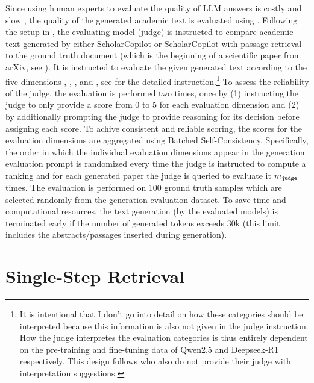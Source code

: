 Since using human experts to evaluate the quality of LLM answers is costly and slow \cite{heineking2025ranking}, the quality of the generated academic text is evaluated using  \cite{guo2025deepseek}. Following the setup in \cite{wang2025scholarcopilot}, the evaluating model (judge) is instructed to compare academic text generated by either ScholarCopilot or ScholarCopilot with passage retrieval to the ground truth document (which is the beginning of a scientific paper from arXiv, see ). It is instructed to evaluate the given generated text according to the five dimensions , , ,  and , see  for the detailed instruction.\footnote{It is intentional that I don't go into detail on how these categories should be interpreted because this information is also not given in the judge instruction. How the judge interpretes the evaluation categories is thus entirely dependent on the pre-training and fine-tuning data of Qwen2.5 and Deepseek-R1 respectively. This design follows \cite{wang2025scholarcopilot} who also do not provide their judge with interpretation suggestions.} To assess the reliability of the judge, the evaluation is performed two times, once by (1) instructing the judge to only provide a score from 0 to 5 for each evaluation dimension and (2) by additionally prompting the judge to provide reasoning for its decision before assigning each score. To achive consistent and reliable scoring, the scores for the evaluation dimensions are aggregated using Batched Self-Consistency. Specifically, the order in which the individual evaluation dimensions appear in the generation evaluation prompt is randomized every time the judge is instructed to compute a ranking and for each generated paper the judge is queried to evaluate it $m_{\texttt{judge}}$ times. The evaluation is performed on 100 ground truth samples which are selected randomly from the generation evaluation dataset. To save time and computational resources, the text generation (by the evaluated models) is terminated early if the number of generated tokens exceeds 30k (this limit includes the abstracts/passages inserted during generation). 

\section{Single-Step Retrieval}\label{retrieval-evaluation}

